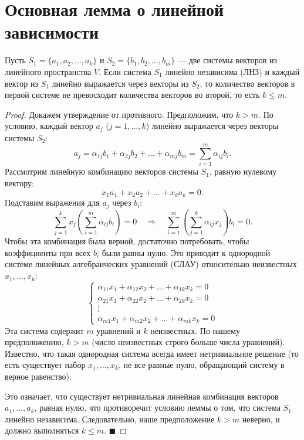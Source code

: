 \section{Основная лемма о линейной зависимости}

\begin{lemma}
Пусть $S_1 = \{a_1, a_2, \dots, a_k\}$ и $S_2 = \{b_1, b_2, \dots, b_m\}$ --- две системы векторов из линейного пространства $V$. Если система $S_1$ линейно независима (ЛНЗ) и каждый вектор из $S_1$ линейно выражается через векторы из $S_2$, то количество векторов в первой системе не превосходит количества векторов во второй, то есть $k \le m$.
\end{lemma}

\begin{proof}
Докажем утверждение от противного. Предположим, что $k > m$.
По условию, каждый вектор $a_j$ ($j = 1, \dots, k$) линейно выражается через векторы системы $S_2$:
\[
a_j = \alpha_{1j}b_1 + \alpha_{2j}b_2 + \dots + \alpha_{mj}b_m = \sum_{i=1}^m \alpha_{ij}b_i.
\]
Рассмотрим линейную комбинацию векторов системы $S_1$, равную нулевому вектору:
\[
x_1 a_1 + x_2 a_2 + \dots + x_k a_k = 0.
\]
Подставим выражения для $a_j$ через $b_i$:
\[
\sum_{j=1}^k x_j \left( \sum_{i=1}^m \alpha_{ij}b_i \right) = 0 \quad \Rightarrow \quad \sum_{i=1}^m \left( \sum_{j=1}^k \alpha_{ij}x_j \right) b_i = 0.
\]
Чтобы эта комбинация была верной, достаточно потребовать, чтобы коэффициенты при всех $b_i$ были равны нулю. Это приводит к однородной системе линейных алгебраических уравнений (СЛАУ) относительно неизвестных $x_1, \dots, x_k$:
\[
\begin{cases}
\alpha_{11}x_1 + \alpha_{12}x_2 + \dots + \alpha_{1k}x_k = 0 \\
\alpha_{21}x_1 + \alpha_{22}x_2 + \dots + \alpha_{2k}x_k = 0 \\
\vdots \\
\alpha_{m1}x_1 + \alpha_{m2}x_2 + \dots + \alpha_{mk}x_k = 0
\end{cases}
\]
Эта система содержит $m$ уравнений и $k$ неизвестных. По нашему предположению, $k > m$ (число неизвестных строго больше числа уравнений). Известно, что такая однородная система всегда имеет нетривиальное решение (то есть существует набор $x_1, \dots, x_k$, не все равные нулю, обращающий систему в верное равенство).

Это означает, что существует нетривиальная линейная комбинация векторов $a_1, \dots, a_k$, равная нулю, что противоречит условию леммы о том, что система $S_1$ линейно независима. 
Следовательно, наше предположение $k > m$ неверно, и должно выполняться $k \le m$.
\hfill$\blacksquare$
\end{proof}
